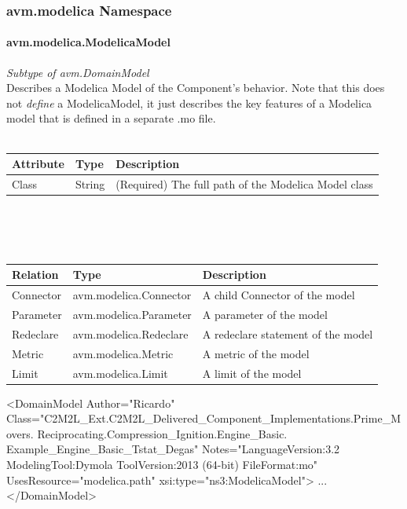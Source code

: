 \subsubsection{avm.modelica Namespace}

\paragraph{avm.modelica.ModelicaModel}
\textit{Subtype of avm.DomainModel}\\
Describes a Modelica Model of the Component's behavior. Note that this does not \textit{define} a ModelicaModel, it just describes the key features of a Modelica model that is defined in a separate .mo file.
\\ \\
\begin{tabular}{ l l p{9cm} }
\textbf{Attribute} & \textbf{Type} & \textbf{Description} \\ \hline
Class & String & (Required) The full path of the Modelica Model class \\ \hline
\end{tabular}
\\ \\ \\
\begin{tabular}{ l l p{9cm} }
\textbf{Relation} & \textbf{Type} & \textbf{Description} \\ \hline
Connector & avm.modelica.Connector & A child Connector of the model \\ \hline
Parameter & avm.modelica.Parameter & A parameter of the model \\ \hline
Redeclare & avm.modelica.Redeclare & A redeclare statement of the model \\ \hline
Metric & avm.modelica.Metric & A metric of the model \\ \hline
Limit & avm.modelica.Limit & A limit of the model \\ \hline
\end{tabular}

\begin{MyVerbatim}
 <DomainModel 
   Author="Ricardo" 
   Class="C2M2L_Ext.C2M2L_Delivered_Component_Implementations.Prime_Movers.
          Reciprocating.Compression_Ignition.Engine_Basic.
          Example_Engine_Basic_Tstat_Degas" 
   Notes="LanguageVersion:3.2 ModelingTool:Dymola ToolVersion:2013 (64-bit)
          FileFormat:mo" 
   UsesResource="modelica.path" 
   xsi:type="ns3:ModelicaModel">
   ...
 </DomainModel>
\end{MyVerbatim}

